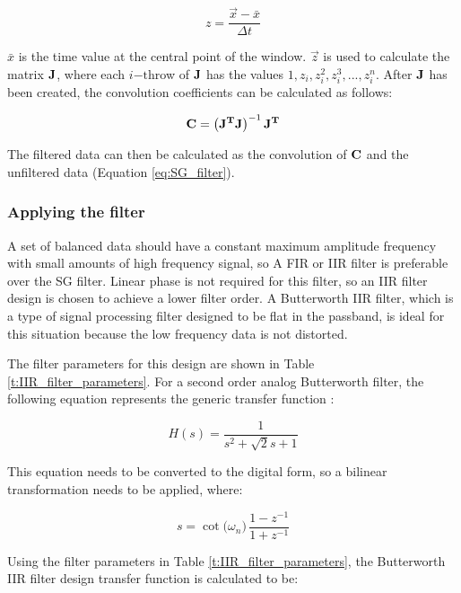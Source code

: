 \begin{equation}
	z = \frac{\vec{x} - \bar{x}}{\Delta t}
\end{equation}

$\bar{x}$ is the time value at the central point of the window.  $\vec{z}$ is used to calculate the matrix $\mathbf{J}$, where each $i\mathrm{-th}$row of $\mathbf{J}$ has the values $1, z_i, z_i^2, z_i^3, ..., z_i^n$.  After $\mathbf{J}$ has been created, the convolution coefficients can be calculated as follows:

\begin{equation}
	\mathbf{C} = \left(\mathbf{J^TJ}\right)^{-1}\mathbf{J^T}
\end{equation}

The filtered data can then be calculated as the convolution of $\mathbf{C}$ and the unfiltered data (Equation \ref{eq:SG_filter}).

\subsubsection{Applying the filter}
A set of balanced data should have a constant maximum amplitude frequency with small amounts of high frequency signal, so A FIR or IIR filter is preferable over the SG filter.  Linear phase is not required for this filter, so an IIR filter design is chosen to achieve a lower filter order.  A Butterworth IIR filter, which is a type of signal processing filter designed to be flat in the passband, is ideal for this situation because the low frequency data is not distorted.

The filter parameters for this design are shown in Table \ref{t:IIR_filter_parameters}.  For a second order analog Butterworth filter, the following equation represents the generic transfer function  \cite{butter_filter_design}:

\begin{equation}
	H(s) = \frac{1}{s^2 + \sqrt{2} s + 1}
\end{equation}

This equation needs to be converted to the digital form, so a bilinear transformation needs to be applied, where:

\begin{equation}
	s = \cot({\omega_n)}\,\frac{1-z^{-1}}{1+z^{-1}}
\end{equation}

Using the filter parameters in Table \ref{t:IIR_filter_parameters}, the Butterworth IIR filter design transfer function is calculated to be:


